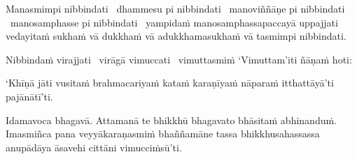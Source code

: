 Manasmimpi nibbindati \breathmark\ dhammesu pi nibbindati \breathmark\ manoviññāṇe pi nibbindati \breathmark\ manosamphasse pi nibbindati \breathmark\ yampidaṁ manosamphassapaccayā uppajjati vedayitaṁ sukhaṁ vā dukkhaṁ vā adukkhamasukhaṁ vā tasmimpi nibbindati.

Nibbindaṁ virajjati \breathmark\ virāgā vimuccati \breathmark\ vimuttasmiṁ `Vimuttam'iti ñāṇaṁ hoti:

`Khīṇā jāti vusitaṁ brahmacariyaṁ kataṁ karaṇīyaṁ nāparaṁ itthattāyā’ti pajānātī’ti.

Idamavoca bhagavā. Attamanā te bhikkhū bhagavato bhāsitaṁ abhinanduṁ. Imasmiñca pana veyyākaraṇasmiṁ bhaññamāne tassa bhikkhusahassassa anupādāya āsavehi cittāni vimucciṁsū’ti.

\suttaRef{[SN 35.28]}

